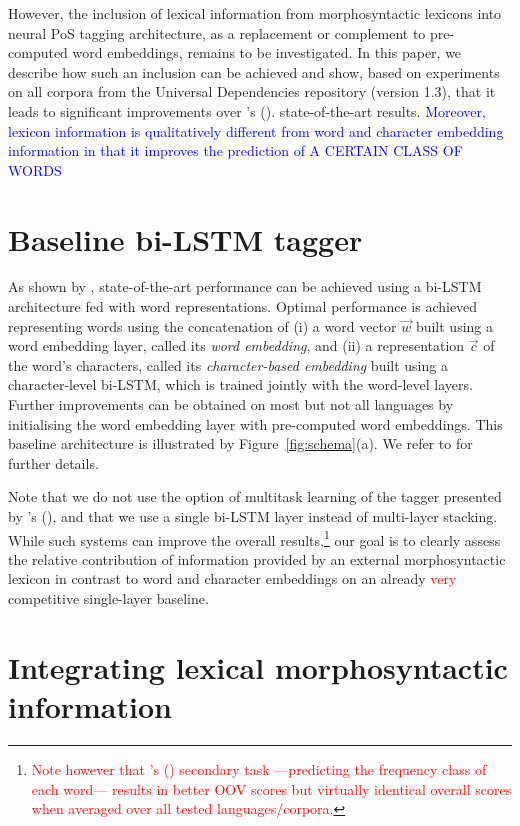 \documentclass[11pt,letterpaper]{article}
\begin{document}
However, the inclusion of lexical information from morphosyntactic lexicons into neural PoS tagging architecture, as a
replacement or complement to pre-computed word embeddings, remains to be investigated. In this paper, we describe how
such an inclusion can be achieved and show, based on experiments on all corpora from the Universal Dependencies
repository (version 1.3), that it leads to significant improvements over \citeauthor{plank16}'s (\citeyear{plank16}).
state-of-the-art results. \textcolor{blue}{Moreover, lexicon information is qualitatively different from word and character embedding information in that it improves the prediction of A CERTAIN CLASS OF WORDS}

\section{Baseline bi-LSTM tagger}
\label{sec:baselinearchitecture}
As shown by \citet{plank16}, state-of-the-art performance can be achieved using a bi-LSTM architecture fed with word
representations. Optimal performance is achieved representing words using the concatenation of (i) a word vector
$\vec{w}$ built using a word embedding layer, called its {\em word embedding}, and (ii) a representation $\vec{c}$ of
the word's characters, called its {\em character-based embedding} built using a character-level bi-LSTM, which is
trained jointly with the word-level layers. Further improvements can be obtained on most but not all languages by
initialising the word embedding layer with pre-computed word embeddings. This baseline architecture is illustrated by
Figure~\ref{fig:schema}(a). We refer to \citet{plank16} for further details.

Note that we do not use the option of multitask learning of the tagger presented by \citeauthor{plank16}'s
(\citeyear{plank16}), and that we use a single bi-LSTM layer instead of multi-layer stacking. While such systems can
improve the overall results,\footnote{\textcolor{red}{Note however that \citeauthor{plank16}'s (\citeyear{plank16})
    secondary task ---predicting the frequency class of each word--- results in better OOV scores but virtually identical
    overall scores when averaged over all tested languages/corpora.}} our goal is to clearly assess the relative
contribution of information provided by an external morphosyntactic lexicon in contrast to word and character embeddings
on an already \textcolor{red}{very} competitive single-layer baseline.

\section{Integrating lexical morphosyntactic information}
\end{document}

